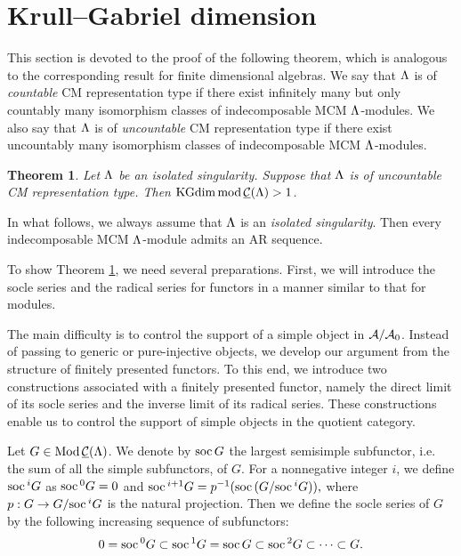 \documentclass[11pt]{amsart}
\newtheorem{theorem}{Theorem}[section]
\theoremstyle{definition}
\numberwithin{equation}{section}
\begin{document}
\section{Krull--Gabriel dimension}\label{C}

This section is devoted to the proof of the following theorem, which is analogous to the corresponding result for finite dimensional algebras. 
We say that $\LL$ is of  {\it countable} CM representation type if there exist infinitely many but only countably many isomorphism classes of indecomposable MCM $\LL$-modules. 
We also say that $\LL$ is of  {\it uncountable} CM representation type if there exist uncountably many isomorphism classes of indecomposable MCM $\LL$-modules.


\begin{theorem}\label{C1}
Let $\LL$ be an isolated singularity. 
Suppose that $\LL$ is of uncountable CM representation type. 
Then $\KGdim \modsCML > 1$. 
\end{theorem}

 
In what follows, we always assume that $\LL$ is an {\it isolated singularity}.   
Then every indecomposable MCM $\LL$-module admits an AR sequence. 

To show Theorem \ref{C1}, we need several preparations. 
First, we will introduce the socle series and the radical series for functors in a manner similar to that for modules. 

The main difficulty is to control the support of a simple object in $\AA/\AA_0$. 
Instead of passing to generic or pure-injective objects, we develop our argument from the structure of finitely presented functors. 
To this end, we introduce two constructions associated with a finitely presented functor, namely the direct limit of its socle series and the inverse limit of its radical series. 
These constructions enable us to control the support of simple objects in the quotient category. 

Let $G \in \ModsCML$. 
We denote by $\soc G$ the largest semisimple subfunctor, i.e. the sum of all the simple subfunctors, of $G$. 
For a nonnegative integer $i$, we define $\soc ^i G$ as $\soc ^0 G = 0$ and
$
\soc ^{i+1} G = p ^{-1}(\soc (G/ \soc ^i G)),
$
where $p : G \to G/\soc ^i G$ is the natural projection. 
Then we define the socle series of $G$ by the following increasing sequence of subfunctors: 
$$
0 = \soc ^0 G \subset \soc ^1 G = \soc G \subset \soc ^2 G \subset \cdots \subset G. 
$$
\end{document}

